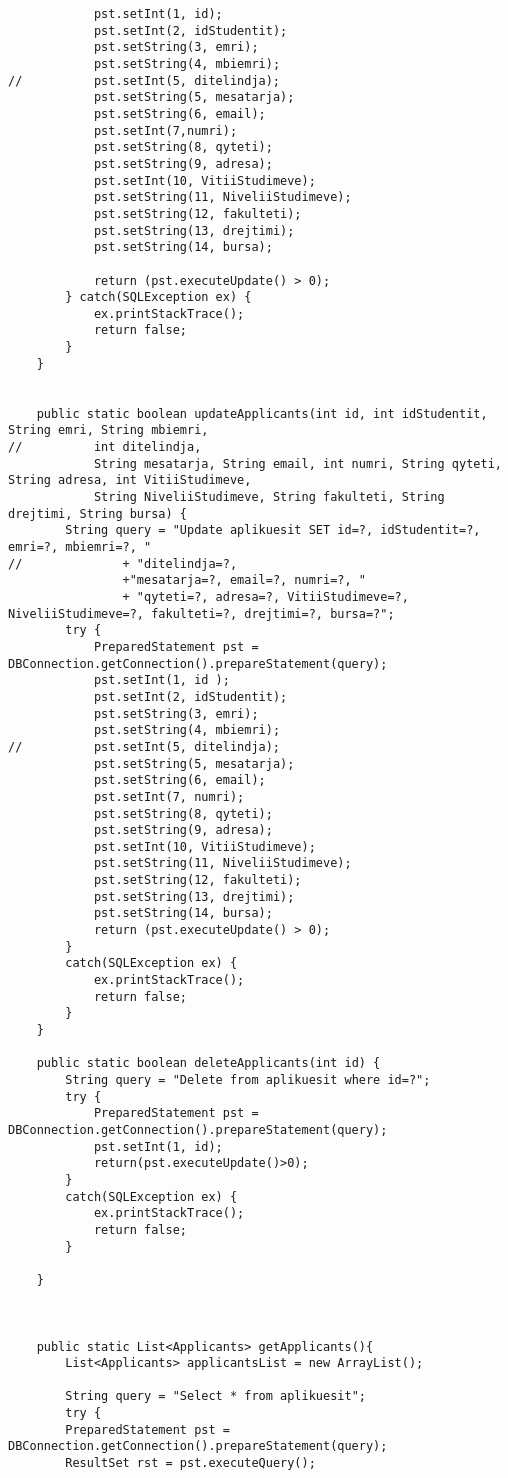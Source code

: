 \documentclass[a4paper]{article}
\begin{document}
\begin{lstlisting}
			pst.setInt(1, id);
			pst.setInt(2, idStudentit);
			pst.setString(3, emri);
			pst.setString(4, mbiemri);
//			pst.setInt(5, ditelindja);
			pst.setString(5, mesatarja);
			pst.setString(6, email);
			pst.setInt(7,numri);
			pst.setString(8, qyteti);
			pst.setString(9, adresa);
			pst.setInt(10, VitiiStudimeve);
			pst.setString(11, NiveliiStudimeve);
			pst.setString(12, fakulteti);
			pst.setString(13, drejtimi);
			pst.setString(14, bursa);
			
			return (pst.executeUpdate() > 0);
		} catch(SQLException ex) {
			ex.printStackTrace();
			return false;	
		}
	}
	
	
	public static boolean updateApplicants(int id, int idStudentit, String emri, String mbiemri,
//			int ditelindja, 
			String mesatarja, String email, int numri, String qyteti, String adresa, int VitiiStudimeve, 
			String NiveliiStudimeve, String fakulteti, String drejtimi, String bursa) {
		String query = "Update aplikuesit SET id=?, idStudentit=?, emri=?, mbiemri=?, "
//				+ "ditelindja=?,
				+"mesatarja=?, email=?, numri=?, "
				+ "qyteti=?, adresa=?, VitiiStudimeve=?, NiveliiStudimeve=?, fakulteti=?, drejtimi=?, bursa=?";
		try {
			PreparedStatement pst = DBConnection.getConnection().prepareStatement(query);
			pst.setInt(1, id );
			pst.setInt(2, idStudentit);
			pst.setString(3, emri);
			pst.setString(4, mbiemri);
//			pst.setInt(5, ditelindja);
			pst.setString(5, mesatarja);
			pst.setString(6, email);
			pst.setInt(7, numri);
			pst.setString(8, qyteti);
			pst.setString(9, adresa);
			pst.setInt(10, VitiiStudimeve);
			pst.setString(11, NiveliiStudimeve);
			pst.setString(12, fakulteti);
			pst.setString(13, drejtimi);
			pst.setString(14, bursa);
			return (pst.executeUpdate() > 0);
		}
		catch(SQLException ex) {
			ex.printStackTrace();
			return false;
		}
	}
	
	public static boolean deleteApplicants(int id) {
		String query = "Delete from aplikuesit where id=?";
		try {
			PreparedStatement pst = DBConnection.getConnection().prepareStatement(query);
			pst.setInt(1, id);
			return(pst.executeUpdate()>0);
		}
		catch(SQLException ex) {
			ex.printStackTrace();
			return false;
		}
		
	}
	
	
	
	public static List<Applicants> getApplicants(){
		List<Applicants> applicantsList = new ArrayList();
	
		String query = "Select * from aplikuesit";
		try {
		PreparedStatement pst = DBConnection.getConnection().prepareStatement(query);
		ResultSet rst = pst.executeQuery();
		

\end{lstlisting}
\end{document}
